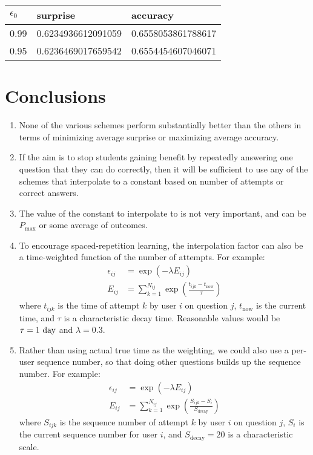\documentclass{article}
\begin{document}
\begin{center}
  \begin{tabular}{lll}
    $\epsilon_0$ & surprise & accuracy \\
    \hline
    0.99 & 0.6234936612091059 & 0.6558053861788617 \\
    0.95 & 0.6236469017659542 & 0.6554454607046071
  \end{tabular}
\end{center}

\newpage
\section{Conclusions}

\begin{enumerate}
\item None of the various schemes perform substantially better than
  the others in terms of minimizing average surprise or maximizing
  average accuracy.
\item If the aim is to stop students gaining benefit by repeatedly
  answering one question that they can do correctly, then it will be
  sufficient to use any of the schemes that interpolate to a constant
  based on number of attempts or correct answers.
\item The value of the constant to interpolate to is not very
  important, and can be $P_{\text{max}}$ or some average of outcomes.
\item To encourage spaced-repetition learning, the interpolation
  factor can also be a time-weighted function of the number of
  attempts. For example:
  \begin{align*}
    \epsilon_{ij} &= \exp(-\lambda E_{ij}) \\
    E_{ij} &= \sum_{k = 1}^{N_{ij}} \exp\left(\frac{t_{ijk} -
        t_{\text{now}}}{\tau}\right)
  \end{align*}
  where $t_{ijk}$ is the time of attempt $k$ by user $i$ on question
  $j$, $t_{\text{now}}$ is the current time, and $\tau$ is a
  characteristic decay time. Reasonable values would be $\tau = 1\rm\
  day$ and $\lambda = 0.3$.
\item Rather than using actual true time as the weighting, we could
  also use a per-user sequence number, so that doing other questions
  builds up the sequence number. For example:
  \begin{align*}
    \epsilon_{ij} &= \exp(-\lambda E_{ij}) \\
    E_{ij} &= \sum_{k = 1}^{N_{ij}} \exp\left(\frac{S_{ijk} -
        S_i}{S_{\text{decay}}}\right)
  \end{align*}
  where $S_{ijk}$ is the sequence number of attempt $k$ by user $i$ on
  question $j$, $S_i$ is the current sequence number for user $i$, and
  $S_{\text{decay}} = 20$ is a characteristic scale.
\end{enumerate}
\end{document}
